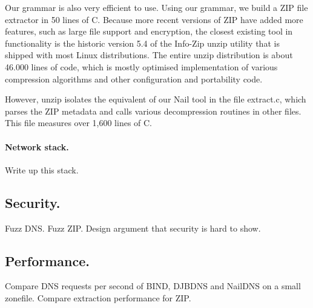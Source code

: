Our grammar is also very efficient to use. Using our grammar, we build a ZIP file extractor in 50
lines of C. Because more recent versions of ZIP have added more features, such as large file support
and encryption, the closest existing tool in functionality is the historic version 5.4 of the Info-Zip unzip
utility\cite{infozip} that is shipped with most Linux distributions. The entire unzip distribution
is about 46.000 lines of code, which is mostly optimised implementation of various compression
algorithms and other configuration and portability code.

However, unzip isolates the equivalent of our Nail tool in the file extract.c, which parses the ZIP
metadata and calls various decompression routines in other files. This file measures over 1,600
lines of C. 

\paragraph{Network stack.}
Write up this stack.
\subsection{Security.} 
Fuzz DNS. Fuzz ZIP. Design argument that security is hard to show. 

\subsection{Performance.}

Compare DNS requests per second of BIND, DJBDNS and NailDNS on a small zonefile.
Compare extraction performance for ZIP. 

